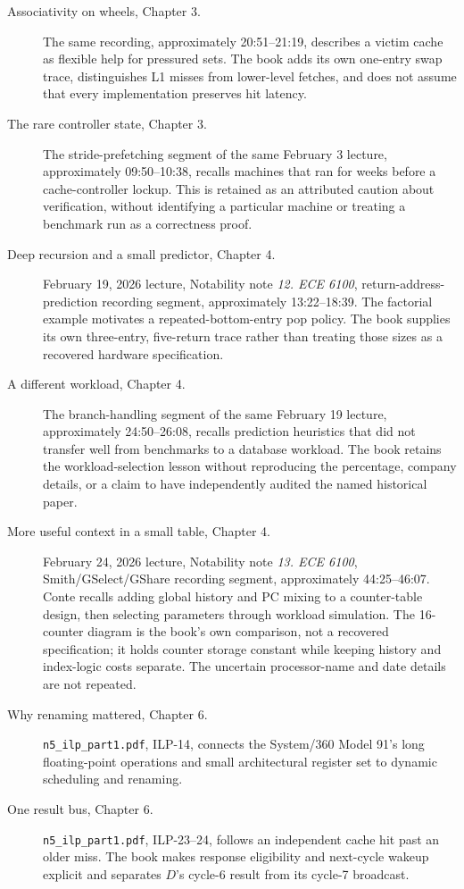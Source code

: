 \begin{description}
  \item[Associativity on wheels, Chapter 3.] The same recording, approximately 20:51--21:19, describes a victim cache as flexible help for pressured sets. The book adds its own one-entry swap trace, distinguishes L1 misses from lower-level fetches, and does not assume that every implementation preserves hit latency.
  \item[The rare controller state, Chapter 3.] The stride-prefetching segment of the same February 3 lecture, approximately 09:50--10:38, recalls machines that ran for weeks before a cache-controller lockup. This is retained as an attributed caution about verification, without identifying a particular machine or treating a benchmark run as a correctness proof.
  \item[Deep recursion and a small predictor, Chapter 4.] February 19, 2026 lecture, Notability note \emph{12. ECE 6100}, return-address-prediction recording segment, approximately 13:22--18:39. The factorial example motivates a repeated-bottom-entry pop policy. The book supplies its own three-entry, five-return trace rather than treating those sizes as a recovered hardware specification.
  \item[A different workload, Chapter 4.] The branch-handling segment of the same February 19 lecture, approximately 24:50--26:08, recalls prediction heuristics that did not transfer well from benchmarks to a database workload. The book retains the workload-selection lesson without reproducing the percentage, company details, or a claim to have independently audited the named historical paper.
  \item[More useful context in a small table, Chapter 4.] February 24, 2026 lecture, Notability note \emph{13. ECE 6100}, Smith/GSelect/GShare recording segment, approximately 44:25--46:07. Conte recalls adding global history and PC mixing to a counter-table design, then selecting parameters through workload simulation. The 16-counter diagram is the book's own comparison, not a recovered specification; it holds counter storage constant while keeping history and index-logic costs separate. The uncertain processor-name and date details are not repeated.
  \item[Why renaming mattered, Chapter 6.] \texttt{n5\_ilp\_part1.pdf}, ILP-14, connects the System/360 Model 91's long floating-point operations and small architectural register set to dynamic scheduling and renaming.
  \item[One result bus, Chapter 6.] \texttt{n5\_ilp\_part1.pdf}, ILP-23--24, follows an independent cache hit past an older miss. The book makes response eligibility and next-cycle wakeup explicit and separates $D$'s cycle-6 result from its cycle-7 broadcast.

\end{description}
